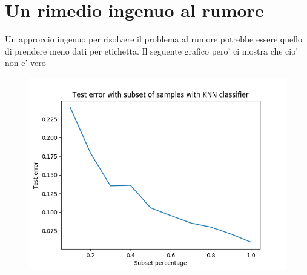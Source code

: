 \section*{Un rimedio ingenuo al rumore}
Un approccio ingenuo per risolvere il problema al rumore potrebbe essere quello di prendere meno dati per etichetta. Il seguente grafico pero' ci mostra che cio' non e' vero

\begin{figure}[H]
	\centering
	\includegraphics[width=0.7\linewidth]{img/rumor_graph_knn}
	\caption{}
	\label{fig:rumorgraphknn}
\end{figure}


